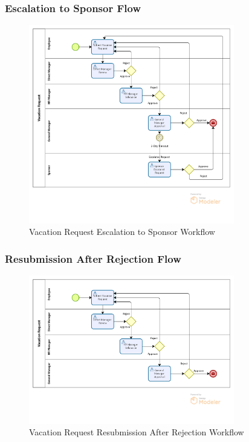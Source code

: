\documentclass[12pt,a4paper]{article}
\begin{document}
\subsubsection{Escalation to Sponsor Flow}
\begin{figure}[H]
\centering
\includegraphics[width=0.8\textwidth]{Diagrams/Workflows/Vacation-Request-Escalation-to-Sponsor/Vacation-Request-Escalation-to-Sponsor.png}
\caption{Vacation Request Escalation to Sponsor Workflow}
\label{fig:escalation-flow}
\end{figure}

\subsubsection{Resubmission After Rejection Flow}
\begin{figure}[H]
\centering
\includegraphics[width=0.8\textwidth]{Diagrams/Workflows/Vacation-Request-Resubmission-After-Rejection/Vacation-Request-Resubmission-After-Rejection.png}
\caption{Vacation Request Resubmission After Rejection Workflow}
\label{fig:resubmission-flow}
\end{figure}
\end{document}
